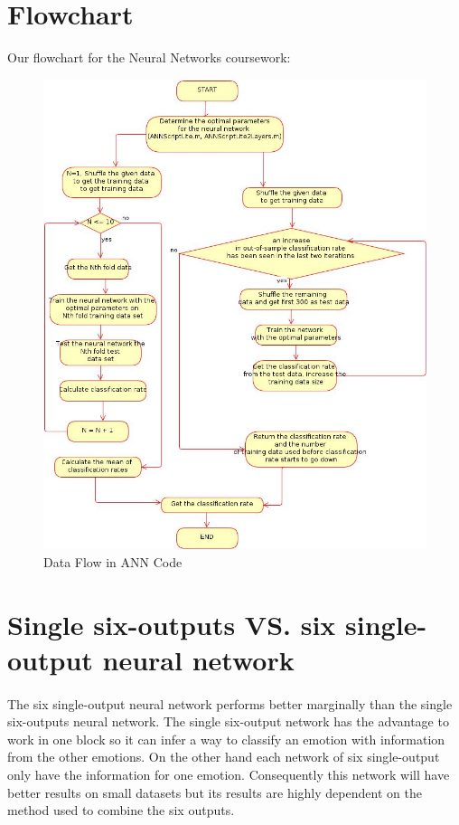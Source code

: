 \documentclass[a4paper,12pt,oneside,final]{report}
\newenvironment{changemargin}[2]{\begin{list}{}{%
\setlength{\topsep}{0pt}%
\setlength{\leftmargin}{0pt}%
\setlength{\rightmargin}{0pt}%
\setlength{\listparindent}{\parindent}%
\setlength{\itemindent}{\parindent}%
\setlength{\parsep}{0pt plus 1pt}%
\addtolength{\leftmargin}{#1}%
\addtolength{\rightmargin}{#2}%
}\item }{\end{list}}
\begin{document}
\section{Flowchart}
Our flowchart for the Neural Networks coursework:
\begin{figure}[!h]
\begin{changemargin}{-20mm}{-20mm}
\center
\includegraphics[scale=0.5]{overall.jpg}
\caption{Data Flow in ANN Code}
\end{changemargin}
\end{figure}

\section{Single six-outputs VS. six single-output neural network}
\paragraph{}
The six single-output neural network performs better marginally than the single six-outputs neural network. The single six-output network has the advantage to work in one block so it can infer a way to classify an emotion with information from the other emotions. On the other hand each network of six single-output only have the information for one emotion. Consequently this network will have better results on small datasets but its results are highly dependent on the method used to combine the six outputs.
\end{document}
